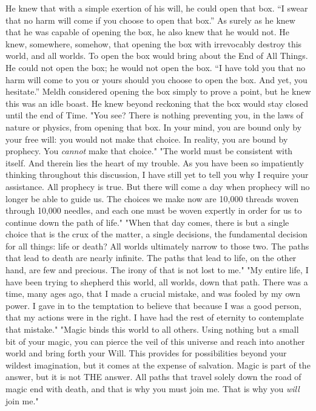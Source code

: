 \begin{flushright}
He knew that with a simple exertion of his will, he could open that box.
\SmallVSpace
“I swear that no harm will come if you choose to open that box.”
\SmallVSpace
As surely as he knew that he was capable of opening the box, he also knew that he would not. He knew, somewhere, somehow, that opening the box with irrevocably destroy this world, and all worlds. To open the box would bring about the End of All Things. He could not open the box; he would not open the box.
\SmallVSpace
“I have told you that no harm will come to you or yours should you choose to open the box. And yet, you hesitate.”
\SmallVSpace
Meldh considered opening the box simply to prove a point, but he knew this was an idle boast. He knew beyond reckoning that the box would stay closed until the end of Time.
\SomeVSpace
"You see? There is nothing preventing you, in the laws of nature or physics, from opening that box. In your mind, you are bound only by your free will: you would not make that choice. In reality, you are bound by prophecy. You \emph{cannot} make that choice."
\SmallVSpace
"The world must be consistent with itself. And therein lies the heart of my trouble. As you have been so impatiently thinking throughout this discussion, I have still yet to tell you why I require your assistance. All prophecy is true. But there will come a day when prophecy will no longer be able to guide us. The choices we make now are 10,000 threads woven through 10,000 needles, and each one must be woven expertly in order for us to continue down the path of life."
\SmallVSpace
"When that day comes, there is but a single choice that is the crux of the matter, a single decisions, the fundamental decision for all things: life or death? All worlds ultimately narrow to those two. The paths that lead to death are nearly infinite. The paths that lead to life, on the other hand, are few and precious. The irony of that is not lost to me."
\SmallVSpace
"My entire life, I have been trying to shepherd this world, all worlds, down that path. There was a time, many ages ago, that I made a crucial mistake, and was fooled by my own power. I gave in to the temptation to believe that because I was a good person, that my actions were in the right. I have had the rest of eternity to contemplate that mistake."
\SmallVSpace
"Magic binds this world to all others. Using nothing but a small bit of your magic, you can pierce the veil of this universe and reach into another world and bring forth your Will. This provides for possibilities beyond your wildest imagination, but it comes at the expense of salvation. Magic is part of the answer, but it is not THE answer. All paths that travel solely down the road of magic end with death, and that is why you must join me. That is why you \emph{will} join me."

\end{flushright}
